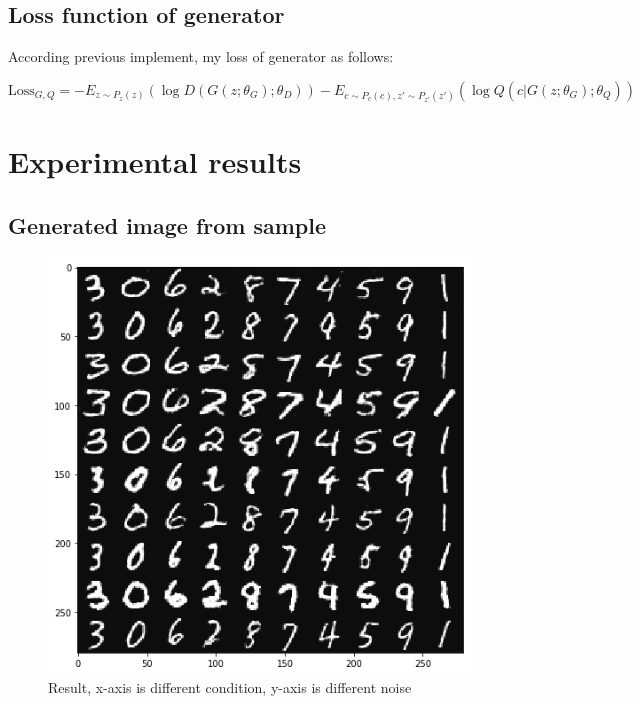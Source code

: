\documentclass[12pt]{article}
\begin{document}
\subsection{Loss function of generator}

According previous implement, my loss of generator as follows:

\begin{equation}
\text{Loss}_{G, Q} = -E_{z\sim P_z(z)}(\log D(G(z; \theta_G); \theta_D) ) - E_{c\sim P_c(c), z' \sim P_{z'}(z')}(\log Q(c| G(z; \theta_G) ;\theta_Q))
\end{equation}

\section{Experimental results}

\subsection{Generated image from sample}

\begin{figure}[H]
\centering
\includegraphics[width=\linewidth]{Images/result.png}
\caption{Result, x-axis is different condition, y-axis is different noise}
\end{figure}
\end{document}

